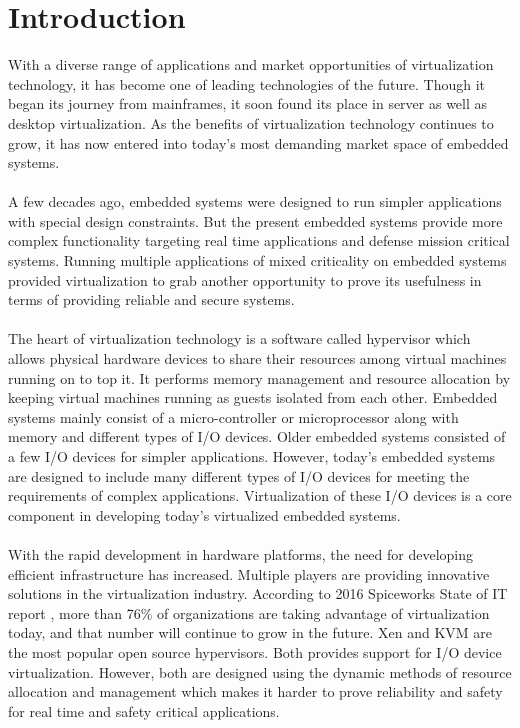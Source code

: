\chapter{Introduction \label{cha:chapter1}}

With a diverse range of applications and market opportunities of virtualization technology, it has become one of leading technologies of the future. Though it began its journey from mainframes, it soon found its place in server as well as desktop virtualization. As the benefits of virtualization technology continues to grow, it has now entered into today's most demanding market space of embedded systems.
\\
\\
A few decades ago, embedded systems were designed to run simpler applications with special design constraints. But the present embedded systems provide more complex functionality targeting real time applications and defense mission critical systems. Running multiple applications of mixed criticality on embedded systems provided virtualization to grab another opportunity to prove its usefulness in terms of providing reliable and secure systems. 
\\
\\
The heart of virtualization technology is a software called hypervisor which allows physical hardware devices to share their resources among virtual machines running on to top it. It performs memory management and resource allocation by keeping virtual machines running as guests isolated from each other. Embedded systems mainly consist of a micro-controller or microprocessor along with memory and different types of I/O devices. Older embedded systems consisted of a few I/O devices for simpler applications. However, today's embedded systems are designed to include many different types of I/O devices for meeting the requirements of complex applications. Virtualization of these I/O devices is a core component in developing today's virtualized embedded systems. 
\\
\\
With the rapid development in hardware platforms, the need for developing efficient infrastructure has increased. Multiple players are providing innovative solutions in the virtualization industry. According to 2016 Spiceworks State of IT report \cite{spiceworks}, more than 76\% of organizations are taking advantage of virtualization today, and that number will continue to grow in the future. Xen and KVM are the most popular open source hypervisors. Both provides support for I/O device virtualization. However, both are designed using the dynamic methods of resource allocation and management which makes it harder to prove reliability and safety for real time and safety critical applications.
